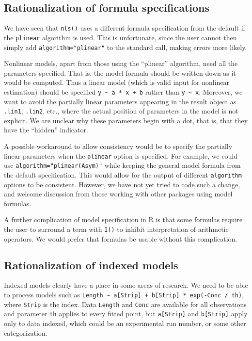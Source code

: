 \hypertarget{rationalization-of-formula-specifications}{%
\subsection{Rationalization of formula specifications}\label{rationalization-of-formula-specifications}}

We have seen that
\texttt{nls()} uses a different formula specification from the default if the
\texttt{plinear} algorithm is used. This is unfortunate, since the user cannot then simply
add \texttt{algorithm="plinear"} to the standard call, making errors more likely.

Nonlinear models, apart from those using the ``plinear'' algorithm, need all the
parameters specified.
That is, the model formula should be written down as it would be computed.
Thus a linear model (which is valid input for nonlinear estimation) should
be specified \texttt{y\ \textasciitilde{}\ a\ *\ x\ +\ b} rather than \texttt{y\ \textasciitilde{}\ x}.
Moreover, we want to avoid the partially linear parameters appearing
in the result object as \texttt{.lin1}, \texttt{.lin2}, etc., where the actual position
of parameters in the model is not explicit. We are unclear why these parameters
begin with a dot, that is, that they have the ``hidden'' indicator.

A possible workaround to allow consistency would be to specify the
partially linear parameters when the \texttt{plinear} option is specified. For example,
we could use \texttt{algorithm="plinear(Asym)"} while keeping the general model formula
from the default specification. This would allow
for the output of different \texttt{algorithm} options to be consistent. However, we have
not yet tried to code such a change, and welcome discussion from those working with
other packages using model formulas.

A further complication of model specification in R is that some formulas require
the user to surround a term with \texttt{I()} to inhibit interpretation of arithmetic
operators. We would prefer that formulas be usable without this complication.

\hypertarget{rationalization-of-indexed-models}{%
\subsection{Rationalization of indexed models}\label{rationalization-of-indexed-models}}

Indexed models clearly have a place in some areas of research.
We need to be able to process models such as
\texttt{Length\ \textasciitilde{}\ a{[}Strip{]}\ +\ b{[}Strip{]}\ *\ exp(-Conc\ /\ th)}, where \texttt{Strip} is the index. Data
\texttt{Length} and \texttt{Conc} are available for all observations and parameter \texttt{th} applies
to every fitted point, but \texttt{a{[}Strip{]}} and \texttt{b{[}Strip{]}} apply only to data indexed, which
could be an experimental run number, or some other categorization.

